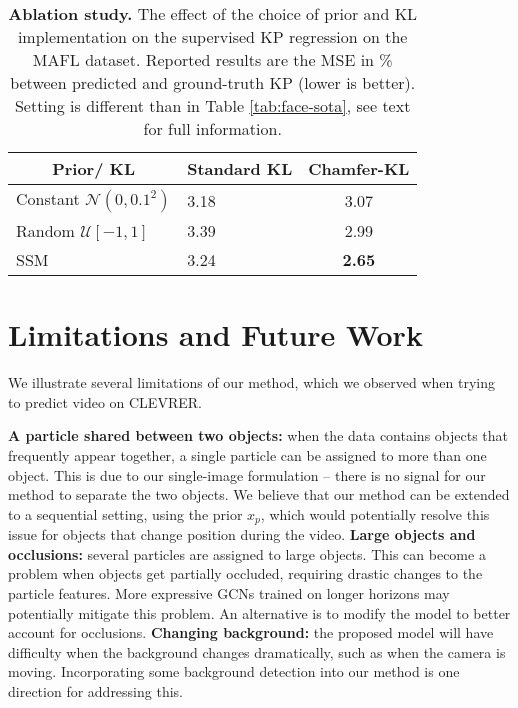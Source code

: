 \documentclass[nohyperref]{article}
\theoremstyle{plain}
\theoremstyle{definition}
\theoremstyle{remark}
\begin{document}
\begin{table}
\setlength{\tabcolsep}{4pt}
    \centering
    \begin{small}
    \begin{tabular}{@{}llc@{}}
    \toprule
    \multicolumn{1}{c}{Prior/ KL}                    & Standard KL  & Chamfer-KL        \\ \midrule
    Constant $\mathcal{N}(0, 0.1^2)$                 & 3.18         & 3.07                         \\
    Random $\mathcal{U}[-1, 1]$                      & 3.39         & 2.99                         \\
    SSM                                              & 3.24         & \textbf{2.65}                          \\ \bottomrule
    \end{tabular}
    \end{small}
    \caption{{\bf Ablation study.} The effect of the choice of prior and KL implementation on the supervised KP regression on the MAFL dataset. Reported results are the MSE in \% between predicted and ground-truth KP (lower is better). Setting is different than in Table \ref{tab:face-sota}, see text for full information.}
    \label{tab:face-ablv}
    \vspace{-1em}
\end{table}

\section{Limitations and Future Work}
\label{sec:limits}
We illustrate several limitations of our method, which we observed when trying to predict video on CLEVRER.

\textbf{A particle shared between two objects:} when the data contains objects that frequently appear together, a single particle can be assigned to more than one object. This is due to our single-image formulation -- there is no signal for our method to separate the two objects. We believe that our method can be extended to a sequential setting, using the prior $x_p$, which would potentially resolve this issue for objects that change position during the video. \textbf{Large objects and occlusions:} several particles are assigned to large objects. This can become a problem when objects get partially occluded, requiring drastic changes to the particle features. More expressive GCNs trained on longer horizons may potentially mitigate this problem. An alternative is to modify the model to better account for occlusions. \textbf{Changing background:} the proposed model will have difficulty when the background changes dramatically, such as when the camera is moving. Incorporating some background detection into our method is one direction for addressing this.
\end{document}
